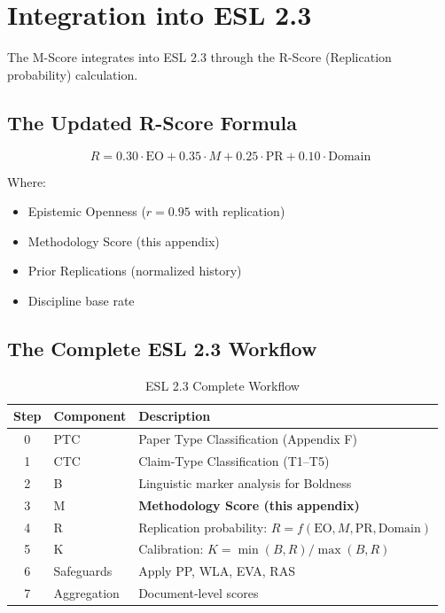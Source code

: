 \documentclass[11pt,a4paper]{article}
\begin{document}
\section{Integration into ESL 2.3}
\label{sec:integration}

The M-Score integrates into ESL 2.3 through the R-Score (Replication probability) calculation.

\subsection{The Updated R-Score Formula}

\begin{formulabox}[title={R-Score (ESL 2.3)}]
\begin{equation}
\boxed{R = 0.30 \cdot \text{EO} + 0.35 \cdot M + 0.25 \cdot \text{PR} + 0.10 \cdot \text{Domain}}
\label{eq:rscore}
\end{equation}

Where:
\begin{itemize}[leftmargin=2cm]
    \item[\textbf{EO}] Epistemic Openness ($r = 0.95$ with replication)
    \item[\textbf{M}] Methodology Score (this appendix)
    \item[\textbf{PR}] Prior Replications (normalized history)
    \item[\textbf{Domain}] Discipline base rate
\end{itemize}
\end{formulabox}

\subsection{The Complete ESL 2.3 Workflow}

\begin{table}[h]
\centering
\caption{ESL 2.3 Complete Workflow}
\label{tab:workflow}
\begin{tabular}{clp{7cm}}
\toprule
\textbf{Step} & \textbf{Component} & \textbf{Description} \\
\midrule
0 & PTC & Paper Type Classification (Appendix F) \\
1 & CTC & Claim-Type Classification (T1--T5) \\
2 & B & Linguistic marker analysis for Boldness \\
3 & M & \textbf{Methodology Score (this appendix)} \\
4 & R & Replication probability: $R = f(\text{EO}, M, \text{PR}, \text{Domain})$ \\
5 & K & Calibration: $K = \min(B, R) / \max(B, R)$ \\
6 & Safeguards & Apply PP, WLA, EVA, RAS \\
7 & Aggregation & Document-level scores \\
\bottomrule
\end{tabular}
\end{table}
\end{document}
